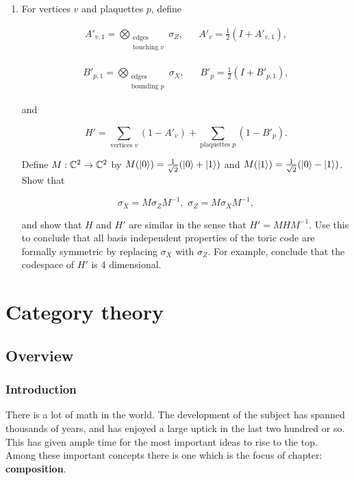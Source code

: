 \documentclass{article}
\theoremstyle{definition}
\numberwithin{figure}{section}
\begin{document}
\begin{enumerate}[\thesection .1.]

\item For vertices $v$ and plaquettes $p$, define

\begin{align*}
A'_{v,1}=\bigotimes_{\substack{\text{edges} \\ \text{touching }v}}\sigma_Z, && A'_v=\frac{1}{2}\left(I + A'_{v,1}\right),
\end{align*}

\begin{align*}
B'_{p,1}=\bigotimes_{\substack{\text{edges} \\ \text{bounding }p}}\sigma_X, && B'_p=\frac{1}{2}\left(I + B'_{p,1}\right),
\end{align*}

and

$$H'=\sum_{\text{vertices }v}(1-A'_v)+\sum_{\text{plaquettes }p}(1-B'_p).$$

Define $M:\mathbb{C}^2\to \mathbb{C}^2$ by $M(\ket{0})=\frac{1}{\sqrt{2}}(\ket{0}+\ket{1})$ and $M(\ket{1})=\frac{1}{\sqrt{2}}(\ket{0}-\ket{1})$. Show that

$$\sigma_X=M\sigma_ZM^{-1},\,\, \sigma_{Z}=M\sigma_X M^{-1},$$

and show that $H$ and $H'$ are similar in the sense that $H'=MHM^{-1}$. Use this to conclude that all basis independent properties of the toric code are formally symmetric by replacing $\sigma_X$ with $\sigma_Z$. For example, conclude that the codespace of $H'$ is 4 dimensional.

\end{enumerate}

\section{Category theory}

\subsection{Overview}

\subsubsection{Introduction}

There is a lot of math in the world. The development of the subject has spanned thousands of years, and has enjoyed a large uptick in the last two hundred or so. This has given ample time for the most important ideas to rise to the top. Among these important concepts there is one which is the focus of chapter: \textbf{composition}.
\end{document}
